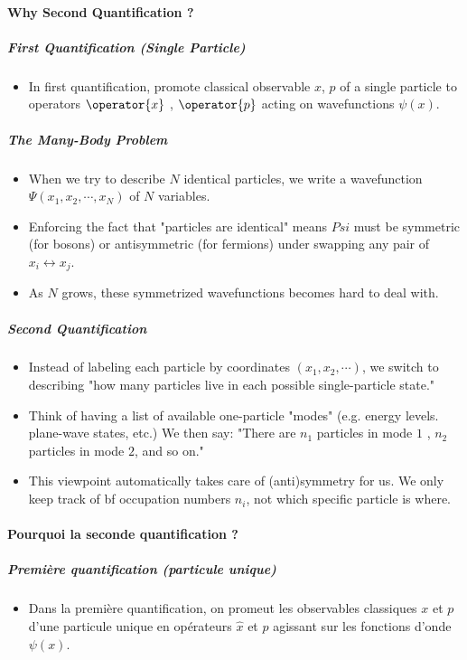 \paragraph{Why Second Quantification ?}

\subparagraph{First Quantification (Single Particle)}
\begin{itemize}[label = $\bullet$]
	\item In first quantification, promote classical observable $x$, $p$ of a single particle to operators  $\operator{x}$ , $\operator{p}$  acting on wavefunctions $\psi(x)$.
\end{itemize}


\subparagraph{The Many-Body Problem}
\begin{itemize}[label = $\bullet$]
	\item When we try to describe $N$ identical particles, we write a wavefunction $\Psi(x_1 , x_2 , \cdots , x_N )$ of $N$ variables.
	\item Enforcing the fact that "particles are identical" means $Psi$ must be symmetric (for bosons) or antisymmetric (for fermions) under swapping any pair of $x_i \leftrightarrow x_j$.
	\item As $N$ grows, these symmetrized wavefunctions becomes hard to deal with.
\end{itemize}

\subparagraph{Second Quantification}
\begin{itemize}[label = $\bullet$]
	\item Instead of labeling each particle by coordinates $(x_1 , x_2 , \cdots )$, we switch to describing "how many particles live in each possible single-particle state."
	\item Think of having a list of available one-particle "modes" (e.g. energy levels. plane-wave states, etc.) We then say: "There are $n_1$ particles in mode $1$ , $n_2$ particles in mode $2$, and so on." 
	\item This viewpoint automatically takes care of (anti)symmetry for us. We only keep track of {bf occupation numbers} $n_i$, not which specific particle is where.	
\end{itemize}

\paragraph{Pourquoi la seconde quantification ?}
\subparagraph{Première quantification (particule unique)}
\begin{itemize}[label = $\bullet$]
\item Dans la première quantification, on promeut les observables classiques $x$ et $p$ d’une particule unique en opérateurs $\hat{x}$ et $\hat{p}$ agissant sur les fonctions d’onde $\psi(x)$.
\end{itemize}

